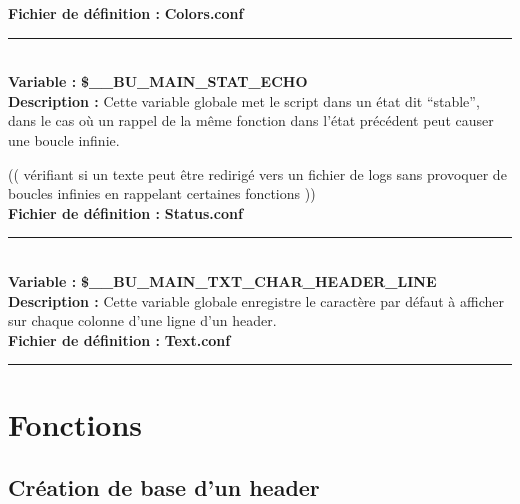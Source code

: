 \documentclass[a4paper,10pt]{article}
\begin{document}
\textbf{Fichier de définition :} \textbf{\color{lime}Colors.conf\color{white}}\\[1\baselineskip]



\par\noindent\rule{\textwidth}{0.4pt}\\[1\baselineskip]

\textbf{Variable :} \textbf{\color{orange}\$\_\_BU\_MAIN\_STAT\_ECHO\color{white}}\\[1\baselineskip]

\textbf{Description :} Cette variable globale met le script dans un état dit ``stable'', dans le cas où un rappel de la même fonction dans l'état précédent peut causer une boucle infinie.


(( vérifiant si un texte peut être redirigé vers un fichier de logs sans provoquer de boucles infinies en\linebreak
rappelant certaines fonctions ))
\\[1\baselineskip]

\textbf{Fichier de définition :} \textbf{\color{lime}Status.conf\color{white}}\\[1\baselineskip]



\par\noindent\rule{\textwidth}{0.4pt}\\[1\baselineskip]

\textbf{Variable :} \textbf{\color{orange}\$\_\_BU\_MAIN\_TXT\_CHAR\_HEADER\_LINE\color{white}}\\[1\baselineskip]

\textbf{Description :} Cette variable globale enregistre le caractère par défaut à afficher sur chaque colonne d'une ligne d'un header.\\[1\baselineskip]

\textbf{Fichier de définition :} \textbf{\color{lime}Text.conf\color{white}}\\[1\baselineskip]



\color{red}\par\noindent\rule{\textwidth}{0.4pt}\color{white}

\color{red}
\section{Fonctions}\color{white}

\color{green}
\subsection{Création de base d'un header}\color{white}
\end{document}
